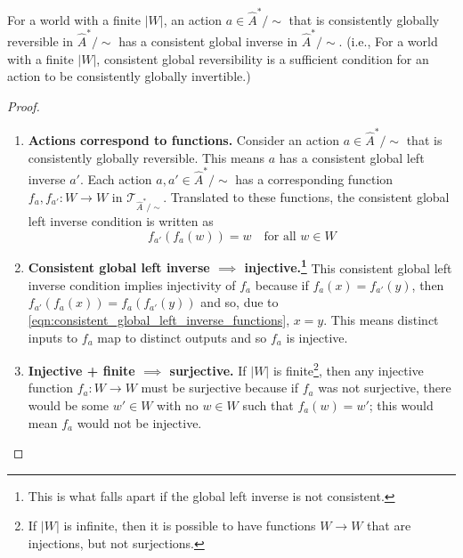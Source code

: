 \begin{proposition}
    For a world with a finite $|W|$, an action $a \in \hat{A}^{*}/\sim$ that is consistently globally reversible in $\hat{A}^{*}/\sim$ has a consistent global inverse in $\hat{A}^{*}/\sim$.
    (i.e., For a world with a finite $|W|$, consistent global reversibility is a sufficient condition for an action to be consistently globally invertible.)
\end{proposition}
\begin{proof}
    \begin{enumerate}[(1)]
    \item \textbf{Actions correspond to functions.}
    Consider an action $a \in \hat{A}^{*}/\sim$ that is consistently globally reversible.
    This means $a$ has a consistent global left inverse $a'$.
    Each action $a, a' \in \hat{A}^{*}/\sim$ has a corresponding function $f_{a}, f_{a'}: W \to W$ in $\mathcal{T}_{\hat{A}^{*}/\sim}$.
    Translated to these functions, the consistent global left inverse condition is written as
    \begin{equation}
        \label{eqn:consistent_global_left_inverse_functions}
        f_{a'}(f_{a}(w)) = w \quad \text{for all $w \in W$}
    \end{equation}

    \item \textbf{Consistent global left inverse $\implies$ injective.\footnote{This is what falls apart if the global left inverse is not consistent.}}
    This consistent global left inverse condition implies injectivity of $f_{a}$ because if $f_{a}(x) = f_{a'}(y)$, then $f_{a'}(f_{a}(x)) = f_{a}(f_{a'}(y))$ and so, due to \cref{eqn:consistent_global_left_inverse_functions}, $x = y$.
    This means distinct inputs to $f_{a}$ map to distinct outputs and so $f_{a}$ is injective.

    \item \textbf{Injective + finite $\implies$ surjective.}
    If $|W|$ is finite\footnote{
    If $|W|$ is infinite, then it is possible to have functions $W \to W$ that are injections, but not surjections. 
    }, then any injective function $f_{a}: W \to W$ must be surjective because if $f_{a}$ was not surjective, there would be some $w' \in W$ with no $w \in W$ such that $f_{a}(w) = w'$; this would mean $f_{a}$ would not be injective.


\end{enumerate}
\end{proof}

